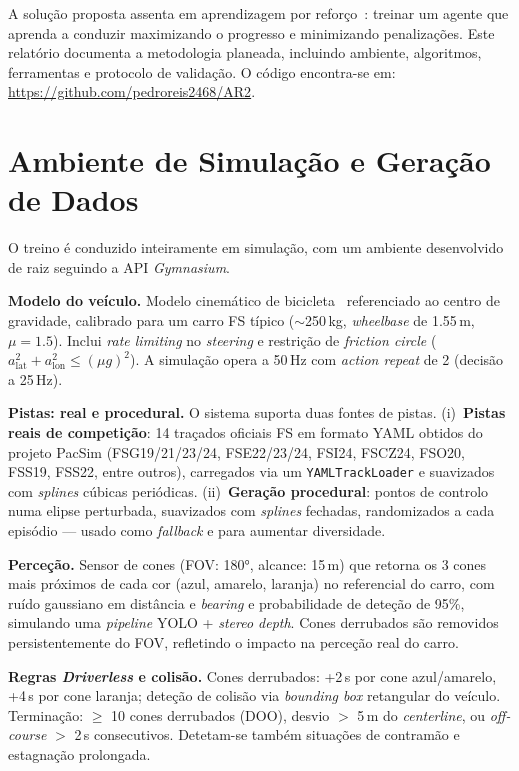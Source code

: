 \documentclass[runningheads]{llncs}
\begin{document}
A solução proposta assenta em aprendizagem por reforço~\cite{sutton2018}: treinar um agente que aprenda a conduzir maximizando o progresso e minimizando penalizações. Este relatório documenta a metodologia planeada, incluindo ambiente, algoritmos, ferramentas e protocolo de validação. O código encontra-se em: \url{https://github.com/pedroreis2468/AR2}.

\section{Ambiente de Simulação e Geração de Dados}

O treino é conduzido inteiramente em simulação, com um ambiente desenvolvido de raiz seguindo a API \textit{Gymnasium}.

\textbf{Modelo do veículo.} Modelo cinemático de bicicleta~\cite{kong2015} referenciado ao centro de gravidade, calibrado para um carro FS típico ($\sim$250\,kg, \textit{wheelbase} de 1.55\,m, $\mu = 1.5$). Inclui \textit{rate limiting} no \textit{steering} e restrição de \textit{friction circle} ($a_\mathrm{lat}^2 + a_\mathrm{lon}^2 \leq (\mu g)^2$). A simulação opera a 50\,Hz com \textit{action repeat} de 2 (decisão a 25\,Hz).

\textbf{Pistas: real e procedural.} O sistema suporta duas fontes de pistas. (i)~\textbf{Pistas reais de competição}: 14 traçados oficiais FS em formato YAML obtidos do projeto PacSim (FSG19/21/23/24, FSE22/23/24, FSI24, FSCZ24, FSO20, FSS19, FSS22, entre outros), carregados via um \texttt{YAMLTrackLoader} e suavizados com \textit{splines} cúbicas periódicas. (ii)~\textbf{Geração procedural}: pontos de controlo numa elipse perturbada, suavizados com \textit{splines} fechadas, randomizados a cada episódio --- usado como \textit{fallback} e para aumentar diversidade.

\textbf{Perceção.} Sensor de cones (FOV: 180°, alcance: 15\,m) que retorna os 3 cones mais próximos de cada cor (azul, amarelo, laranja) no referencial do carro, com ruído gaussiano em distância e \textit{bearing} e probabilidade de deteção de 95\%, simulando uma \textit{pipeline} YOLO + \textit{stereo depth}. Cones derrubados são removidos persistentemente do FOV, refletindo o impacto na perceção real do carro.

\textbf{Regras \textit{Driverless} e colisão.} Cones derrubados: +2\,s por cone azul/amarelo, +4\,s por cone laranja; deteção de colisão via \textit{bounding box} retangular do veículo. Terminação: $\geq$ 10 cones derrubados (DOO), desvio $>$ 5\,m do \textit{centerline}, ou \textit{off-course} $>$ 2\,s consecutivos. Detetam-se também situações de contramão e estagnação prolongada.
\end{document}

